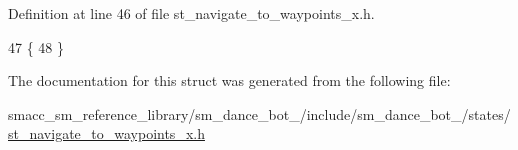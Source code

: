 Definition at line 46 of file st\+\_\+navigate\+\_\+to\+\_\+waypoints\+\_\+x.\+h.


\begin{DoxyCode}
47   \{
48   \}
\end{DoxyCode}


The documentation for this struct was generated from the following file\+:\begin{DoxyCompactItemize}
\item 
smacc\+\_\+sm\+\_\+reference\+\_\+library/sm\+\_\+dance\+\_\+bot\+\_/include/sm\+\_\+dance\+\_\+bot\+\_/states/\hyperlink{2_2include_2sm__dance__bot__2_2states_2st__navigate__to__waypoints__x_8h}{st\+\_\+navigate\+\_\+to\+\_\+waypoints\+\_\+x.\+h}\end{DoxyCompactItemize}

